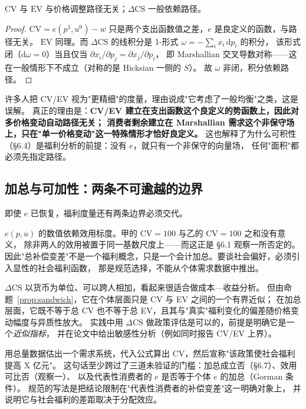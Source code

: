 \begin{proposition}[CV/EV 无路径依赖]\label{prop:no-path}
$\mathrm{CV}$ 与 $\mathrm{EV}$ 与价格调整路径无关；$\Delta\mathrm{CS}$ 一般依赖路径。
\end{proposition}

\begin{proof}
$\mathrm{CV}=e(p^1,u^0)-w$ 只是两个支出函数值之差，$e$ 是良定义的函数，与路径无关。
$\mathrm{EV}$ 同理。而 $\Delta\mathrm{CS}$ 的线积分是 1-形式 $\omega=-\sum_ix_i\,\mathrm dp_i$ 的积分，
该形式闭（$\mathrm d\omega=0$）当且仅当 $\partial x_i/\partial p_j=\partial x_j/\partial p_i$，
即 Marshallian 交叉导数对称——这在一般情形下不成立（对称的是 Hicksian 一侧的 $S$）。
故 $\omega$ 非闭，积分依赖路径。
\end{proof}

\begin{remark}[这是 CV/EV 最重要的技术优势]
许多人把 CV/EV 视为"更精细"的度量，理由说成"它考虑了一般均衡"之类，这是误解。
真正的理由是：\textbf{CV/EV 建立在支出函数这个良定义的势函数上，因此对多价格变动自动路径无关；
消费者剩余建立在 Marshallian 需求这个非保守场上，只在"单一价格变动"这一特殊情形才恰好良定义。}
这也解释了为什么可积性（\S 6.4）是福利分析的前提：没有 $e$，就只有一个非保守的向量场，
任何"面积"都必须先指定路径。
\end{remark}

\subsection{加总与可加性：两条不可逾越的边界}

即使 $e$ 已恢复，福利度量还有两条边界必须交代。


$e(p,u)$ 的数值依赖效用标度。甲的 $\mathrm{CV}=100$ 与乙的 $\mathrm{CV}=100$ 之和没有意义，
除非两人的效用被置于同一基数尺度上——而这正是 \S 6.1 观察一所否定的。
因此"总补偿变差"不是一个福利概念，只是一个会计加总。要谈社会偏好，必须引入显性的社会福利函数，
那是规范选择，不能从个体需求数据中推出。


$\Delta\mathrm{CS}$ 以货币为单位、可以跨人相加，看起来很适合做成本—收益分析。
但由命题~\ref{prop:sandwich}，它在个体层面只是 CV 与 EV 之间的一个有界近似；
在加总层面，它既不等于总 CV 也不等于总 EV，且其与"真实"福利变化的偏差随价格变动幅度与异质性放大。
实践中用 $\Delta\mathrm{CS}$ 做政策评估是可以的，前提是明确它是一个\emph{近似指标}，
并在论文中给出敏感性分析（例如同时报告 CV/EV 上界）。

\begin{remark}[一个常见的误用]
用总量数据估出一个需求系统，代入公式算出 CV，然后宣称"该政策使社会福利提高 X 亿元"。
这句话至少跨过了三道未验证的门槛：加总成立否（\S 6.7）、效用可比否（观察一）、
以及代表性消费者的 $e$ 是否等于个体 $e$ 的加总（Gorman 条件）。
规范的写法是把结论限制在"代表性消费者的补偿变差"这一明确对象上，
并说明它与社会福利的差距取决于分配效应。
\end{remark}
